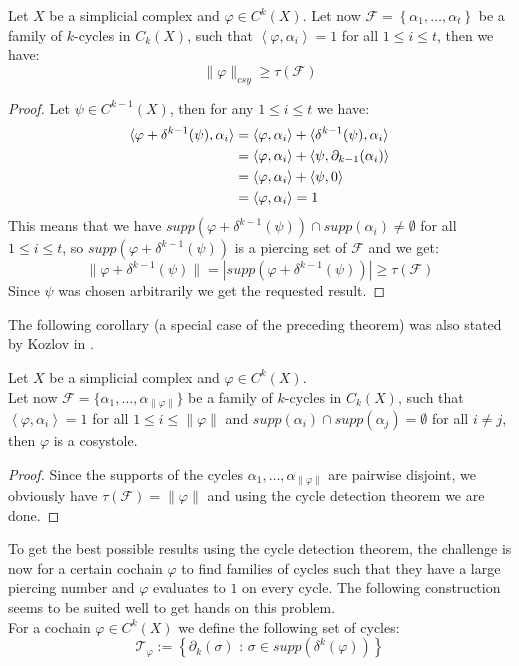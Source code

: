 \begin{thm}\label{theorem9}
Let \(X\) be a simplicial complex and \(\varphi\in C^k(X)\). Let now \(\mathcal{F}=\left\{\alpha_1,\ldots,\alpha_t\right\}\) be a family of \(k\)-cycles in \(C_k(X)\), such that \(\left\langle\varphi,\alpha_i\right\rangle=1\) for all \(1\leq i\leq t\), then we have:
\[
\|\varphi\|_{csy}\geq\tau(\mathcal{F})
\]
\begin{proof}
Let \(\psi\in C^{k-1}(X)\), then for any \(1\leq i\leq t\) we have:
\begin{align}
\langle\varphi+\delta^{k-1}(\psi),\alpha_i\rangle&=\langle\varphi,\alpha_i\rangle+\langle\delta^{k-1}(\psi),\alpha_i\rangle\notag\\
&=\langle\varphi,\alpha_i\rangle+\langle\psi,\partial_{k-1}(\alpha_i)\rangle\notag\\
&=\langle\varphi,\alpha_i\rangle+\langle\psi,0\rangle\notag\\
&=\langle\varphi,\alpha_i\rangle=1\notag
\end{align}
This means that we have \(supp(\varphi+\delta^{k-1}(\psi))\cap supp(\alpha_i)\neq\emptyset\) for all \(1\leq i\leq t\), so \(supp(\varphi+\delta^{k-1}(\psi))\) is a piercing set of \(\mathcal{F}\) and we get:
\[
\|\varphi+\delta^{k-1}(\psi)\|=|supp(\varphi+\delta^{k-1}(\psi))|\geq\tau(\mathcal{F})
\]
Since \(\psi\) was chosen arbitrarily we get the requested result.
\end{proof}
\end{thm}

The following corollary (a special case of the preceding theorem) was also stated by Kozlov in \cite{6}.

\begin{cor}
Let \(X\) be a simplicial complex and \(\varphi\in C^k(X)\).\\
Let now \(\mathcal{F}=\{\alpha_1,\ldots,\alpha_{\|\varphi\|}\}\) be a family of \(k\)-cycles in \(C_k(X)\), such that \(\left\langle\varphi,\alpha_i\right\rangle=1\) for all \(1\leq i\leq\|\varphi\|\) and \(supp(\alpha_i)\cap supp(\alpha_j)=\emptyset\) for all \(i\neq j\), then \(\varphi\) is a cosystole.
\begin{proof}
Since the supports of the cycles \(\alpha_1,\ldots,\alpha_{\|\varphi\|}\) are pairwise disjoint, we obviously have \(\tau(\mathcal{F})=\|\varphi\|\) and using the cycle detection theorem we are done.
\end{proof}
\end{cor}

To get the best possible results using the cycle detection theorem, the challenge is now for a certain cochain \(\varphi\) to find families of cycles such that they have a large piercing number and \(\varphi\) evaluates to \(1\) on every cycle. The following construction seems to be suited well to get hands on this problem.\\
For a cochain \(\varphi\in C^k(X)\) we define the following set of cycles:
\[
\mathcal{T}_{\varphi}:=\left\{\partial_k(\sigma)\text{ : }\sigma\in supp(\delta^k(\varphi))\right\}
\]

